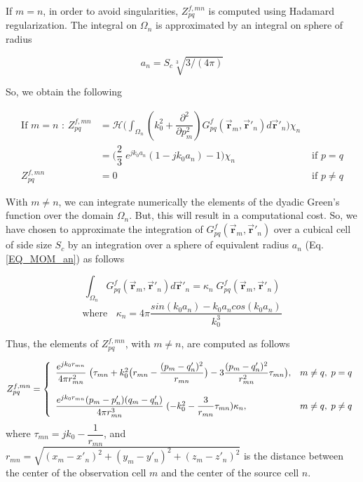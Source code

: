 \documentclass{article}
\begin{document}
If $m=n$, in order to avoid singularities, $Z_{pq}^{f,mn}$ is computed using Hadamard regularization. The integral on $\Omega_n$ is approximated by an integral on sphere of radius 

\begin{equation}
\label{EQ_MOM_an}
a_n=S_c\sqrt[3]{3/(4\pi)}
\end{equation} 

So, we obtain the following 

\begin{equation}
\label{EQ_MoM_m-eq-n}
\begin{aligned}
\text{If } m=n \text{ : } Z_{pq}^{f, mn} & = \mathcal{H} \bigg ( \int_{\Omega_n} (k_0^2+\dfrac{\partial^2}{\partial p_m^2})G^f_{pq} (\vec{\textbf{r}}_m,\vec{\textbf{r}}'_n) d\vec{\textbf{r}}'_n \bigg )  \chi_n \\
& = \bigg ( \dfrac{2}{3} \; e^{jk_0a_n}(1-jk_0a_n) - 1 \bigg )  \chi_n  & \text{ if } p=q \\
Z_{pq}^{f, mn} & = 0 &\text{ if } p \ne q 
\end{aligned}
\end{equation} 

With $m \ne n$, we can integrate numerically the elements of the dyadic Green's function over the domain $\Omega_n$. But, this will result in a  computational cost. So, we have chosen to approximate the integration of $G_{pq}^f(\vec{\textbf{r}}_m,\vec{\textbf{r}}'_n)$ over a cubical cell of side size $S_c$ by an integration over a sphere of equivalent radius $a_n$ (Eq. \ref{EQ_MOM_an}) as follows

\begin{equation}
\label{EQ_MoM-m-neq-n_1}
\int_{\Omega_n} G^f_{pq} (\vec{\textbf{r}}_m,\vec{\textbf{r}}'_n) d\vec{\textbf{r}}'_n = \kappa_n \; G^f_{pq} (\vec{\textbf{r}}_m,\vec{\textbf{r}}'_n)
\end{equation} 
\begin{equation}
\label{EQ_MoM-m-neq-n_2}
\text{where } \; \; \kappa_n = 4\pi \dfrac{sin(k_0a_n)-k_0a_ncos(k_0a_n)}{k_0^3}  \nonumber
\end{equation} 

Thus, the elements of $Z_{pq}^{f, mn}$, with $m \ne n$, are computed as follows  

\begin{equation}
\label{EQ_MoM_Zmnpq}
Z_{pq}^{f, mn} = 
\left \lbrace
\begin{array}{l l}
\dfrac{e^{j k_0 r_{mn}}}{4 \pi r^2_{mn}} \; \big ( \tau_{mn} + k^2_0 \big (r_{mn} - \dfrac{(p_m-q_n')^2}{r_{mn}} \big ) - 3 \dfrac{(p_m-q_n')^2}{r^2_{mn}} \tau_{mn} \big ), & m \ne q, \; p=q \\
\text{ } & \text{ } \\
\dfrac{e^{j k_0 r_{mn}} (p_m-p'_n) (q_m-q'_n)}{4 \pi r_{mn}^3} \; (-k_0^2 - \dfrac{3}{r_{mn}} \tau_{mn}) \kappa_n, & m \ne q, \; p \ne q
\end{array} \right . 
\end{equation}
where $\tau_{mn} = jk_0 - \dfrac{1}{r_{mn}}$, and $r_{mn} = \sqrt{(x_m-x'_n)^2 + (y_m-y'_n)^2 + (z_m-z'_n)^2}$ is the distance between the center of the observation cell $m$ and the center of the source cell $n$.
\end{document}
